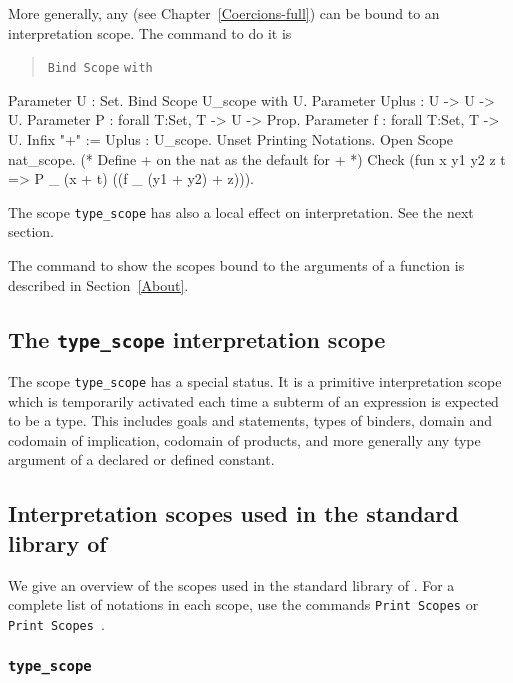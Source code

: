 More generally, any {\class} (see Chapter~\ref{Coercions-full}) can be
bound to an interpretation scope. The command to do it is
\begin{quote}
{\tt Bind Scope} {\scope} \texttt{with} {\class}
\end{quote}

\Example
\begin{coq_example}
Parameter U : Set.
Bind Scope U_scope with U.
Parameter Uplus : U -> U -> U.
Parameter P : forall T:Set, T -> U -> Prop.
Parameter f : forall T:Set, T -> U.
Infix "+" := Uplus : U_scope.
Unset Printing Notations.
Open Scope nat_scope. (* Define + on the nat as the default for + *)
Check (fun x y1 y2 z t => P _ (x + t) ((f _ (y1 + y2) + z))).
\end{coq_example}

\Rem The scope {\tt type\_scope} has also a local effect on
interpretation. See the next section.

\SeeAlso The command to show the scopes bound to the arguments of a
function is described in Section~\ref{About}.

\subsection[The {\tt type\_scope} interpretation scope]{The {\tt type\_scope} interpretation scope}

The scope {\tt type\_scope} has a special status. It is a primitive
interpretation scope which is temporarily activated each time a
subterm of an expression is expected to be a type. This includes goals
and statements, types of binders, domain and codomain of implication,
codomain of products, and more generally any type argument of a
declared or defined constant.

\subsection{Interpretation scopes used in the standard library of {\Coq}}

We give an overview of the scopes used in the standard library of
{\Coq}. For a complete list of notations in each scope, use the
commands {\tt Print Scopes} or {\tt Print Scopes {\scope}}.

\subsubsection{\tt type\_scope}

